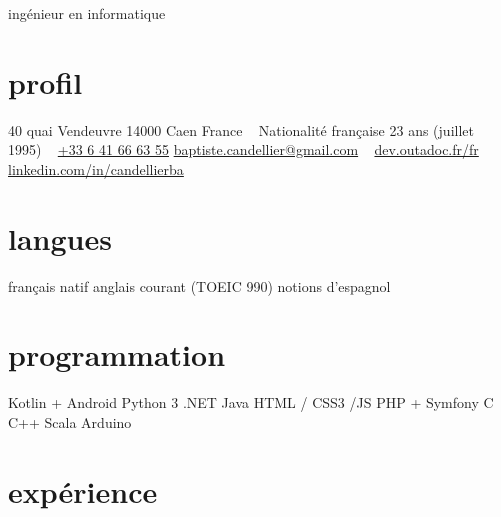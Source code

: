 \documentclass[]{friggeri-cv}
\begin{document}
{ingénieur en informatique}

\begin{aside}
    \section{profil}
    40 quai Vendeuvre
    14000 Caen
    France
    ~
    Nationalité française
    23 ans (juillet 1995)
    ~
    \href{tel:0033641666355}{+33 6 41 66 63 55}
    \href{mailto:baptiste.candellier@gmail.com}{baptiste.candellier@gmail.com}
    ~
    {\NoAutoSpacing\href{https://dev.outadoc.fr/fr}{dev.outadoc.fr/fr}}
    {\NoAutoSpacing\href{https://www.linkedin.com/in/candellierba/}{linkedin.com/in/candellierba}}
    \section{langues}
    français natif
    anglais courant (TOEIC 990)
    notions d'espagnol
    \section{programmation}
    Kotlin + Android 
    Python 3 
    \csharp{} .NET 
    Java 
    HTML / CSS3 /JS 
    PHP + Symfony 
    C 
    C++ 
    Scala 
    Arduino 
    \restorecr 
    \obeycr
\end{aside}

\section{expérience}
\end{document}
